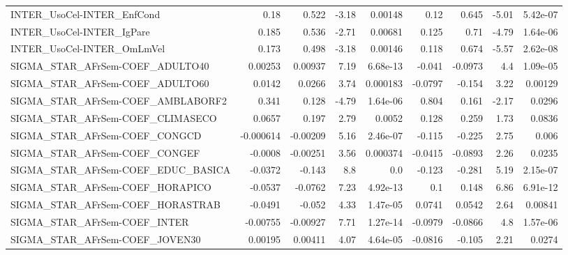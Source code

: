 \begin{tabular}{lrrrrrrrr}
INTER\_UsoCel-INTER\_EnfCond            &        0.18 &        0.522 &    -3.18 &  0.00148 &       0.12 &       0.645 &        -5.01 &      5.42e-07 \\
INTER\_UsoCel-INTER\_IgPare             &       0.185 &        0.536 &    -2.71 &  0.00681 &      0.125 &        0.71 &        -4.79 &      1.64e-06 \\
INTER\_UsoCel-INTER\_OmLmVel            &       0.173 &        0.498 &    -3.18 &  0.00146 &      0.118 &       0.674 &        -5.57 &      2.62e-08 \\
SIGMA\_STAR\_AFrSem-COEF\_ADULTO40       &     0.00253 &      0.00937 &     7.19 & 6.68e-13 &     -0.041 &     -0.0973 &          4.4 &      1.09e-05 \\
SIGMA\_STAR\_AFrSem-COEF\_ADULTO60       &      0.0142 &       0.0266 &     3.74 & 0.000183 &    -0.0797 &      -0.154 &         3.22 &       0.00129 \\
SIGMA\_STAR\_AFrSem-COEF\_AMBLABORF2     &       0.341 &        0.128 &    -4.79 & 1.64e-06 &      0.804 &       0.161 &        -2.17 &        0.0296 \\
SIGMA\_STAR\_AFrSem-COEF\_CLIMASECO      &      0.0657 &        0.197 &     2.79 &   0.0052 &      0.128 &       0.259 &         1.73 &        0.0836 \\
SIGMA\_STAR\_AFrSem-COEF\_CONGCD         &   -0.000614 &     -0.00209 &     5.16 & 2.46e-07 &     -0.115 &      -0.225 &         2.75 &         0.006 \\
SIGMA\_STAR\_AFrSem-COEF\_CONGEF         &     -0.0008 &     -0.00251 &     3.56 & 0.000374 &    -0.0415 &     -0.0893 &         2.26 &        0.0235 \\
SIGMA\_STAR\_AFrSem-COEF\_EDUC\_BASICA    &     -0.0372 &       -0.143 &      8.8 &      0.0 &     -0.123 &      -0.281 &         5.19 &      2.15e-07 \\
SIGMA\_STAR\_AFrSem-COEF\_HORAPICO       &     -0.0537 &      -0.0762 &     7.23 & 4.92e-13 &        0.1 &       0.148 &         6.86 &      6.91e-12 \\
SIGMA\_STAR\_AFrSem-COEF\_HORASTRAB      &     -0.0491 &       -0.052 &     4.33 & 1.47e-05 &     0.0741 &      0.0542 &         2.64 &       0.00841 \\
SIGMA\_STAR\_AFrSem-COEF\_INTER          &    -0.00755 &     -0.00927 &     7.71 & 1.27e-14 &    -0.0979 &     -0.0866 &          4.8 &      1.57e-06 \\
SIGMA\_STAR\_AFrSem-COEF\_JOVEN30        &     0.00195 &      0.00411 &     4.07 & 4.64e-05 &    -0.0816 &      -0.105 &         2.21 &        0.0274 \\

\end{tabular}
